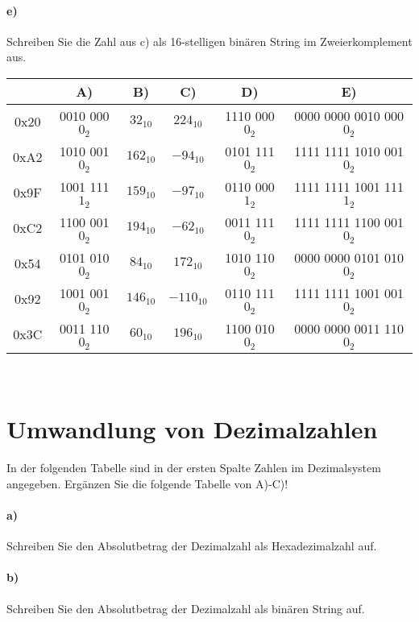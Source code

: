 \documentclass[paper=a4, fontsize=11pt]{scrartcl}
\numberwithin{equation}{section}
\numberwithin{figure}{section}
\numberwithin{table}{section}
\begin{document}
\paragraph{e)}
Schreiben Sie die Zahl aus c) als 16-stelligen binären String im Zweierkomplement aus. \\

\begin{tabular}{|c|c|c|c|c|c|}
\hline
& A) & B) & C) & D) & E) \\
\hline
0x20 & 0010 000$0_{2}$ & $32_{10}$ & $224_{10}$ & 1110 000$0_{2}$ & 0000 0000 0010 000$0_{2}$ \\
\hline
0xA2 & 1010 001$0_{2}$ & $162_{10}$ & $-94_{10}$ & 0101 111$0_{2}$ & 1111 1111 1010 001$0_{2}$ \\
\hline
0x9F & 1001 111$1_{2}$ & $159_{10}$ & $-97_{10}$ & 0110 000$1_{2}$ & 1111 1111 1001 111$1_{2}$ \\
\hline
0xC2 & 1100 001$0_{2}$ & $194_{10}$ & $-62_{10}$ & 0011 111$0_{2}$ & 1111 1111 1100 001$0_{2}$ \\
\hline
0x54 & 0101 010$0_{2}$ & $84_{10}$ & $172_{10}$ & 1010 110$0_{2}$ & 0000 0000 0101 010$0_{2}$ \\
\hline
0x92 & 1001 001$0_{2}$ & $146_{10}$ & $-110_{10}$ & 0110 111$0_{2}$ & 1111 1111 1001 001$0_{2}$ \\
\hline
0x3C & 0011 110$0_{2}$ & $60_{10}$ & $196_{10}$ & 1100 010$0_{2}$ & 0000 0000 0011 110$0_{2}$ \\
\hline
\end{tabular} \\


\section{Umwandlung von Dezimalzahlen}

In der folgenden Tabelle sind in der ersten Spalte Zahlen im Dezimalsystem angegeben. Ergänzen Sie die folgende Tabelle von A)-C)!

\paragraph{a)}
Schreiben Sie den Absolutbetrag der Dezimalzahl als Hexadezimalzahl auf. \\

\paragraph{b)}
Schreiben Sie den Absolutbetrag der Dezimalzahl als binären String auf. \\
\end{document}
